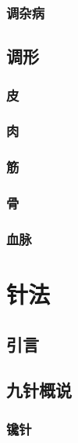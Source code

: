 \documentclass[
]{book}
\begin{document}
\subsection{调杂病}\label{ux8c03ux6742ux75c5}

\section{调形}\label{ux8c03ux5f62}

\subsection{皮}\label{ux76ae}

\subsection{肉}\label{ux8089}

\subsection{筋}\label{ux7b4b}

\subsection{骨}\label{ux9aa8}

\subsection{血脉}\label{ux8840ux8109}

\chapter{针法}\label{ux9488ux6cd5}

\section*{引言}\label{ux5f15ux8a00-3}

\section{九针概说}\label{ux4e5dux9488ux6982ux8bf4}

\subsection{镵针}\label{ux9575ux9488}
\end{document}
